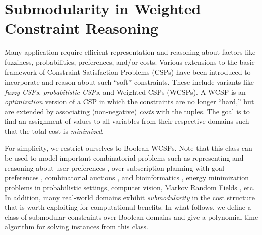 
\section{Submodularity in Weighted Constraint Reasoning}
  Many application require efficient representation and reasoning about factors like fuzziness, probabilities, preferences, and/or costs. Various extensions to the basic framework of Constraint Satisfaction Problems (CSPs) \cite{D:BOOK:03} have been introduced to incorporate and reason about such ``soft'' constraints. These include variants like \emph{fuzzy-CSPs}, \emph{probabilistic-CSPs}, and Weighted-CSPs (WCSPs). A WCSP is an \emph{optimization} version of a CSP in which the constraints are no longer ``hard,'' but are extended by associating (non-negative) \emph{costs} with the tuples. The goal is to find an assignment of values to all variables from their respective domains such that the total cost is \emph{minimized}.
  
  For simplicity, we restrict ourselves to Boolean WCSPs. Note that this class can be used to model important combinatorial problems such as representing and reasoning about user preferences \cite{BBDHP:JAIR:04}, over-subscription planning with goal preferences \cite{D:IJCAI:07}, combinatorial auctions \cite{S:AI:02}, and bioinformatics \cite{SGSST:AI:07}, energy minimization problems in probabilistic settings, computer vision, Markov Random Fields \cite{K:MSR:05}, etc. In addition, many real-world domains exhibit \emph{submodularity} in the cost structure that is worth exploiting for computational benefits. In what follows, we define a class of submodular constraints over Boolean domains and give a polynomial-time algorithm for solving instances from this class. 
  
